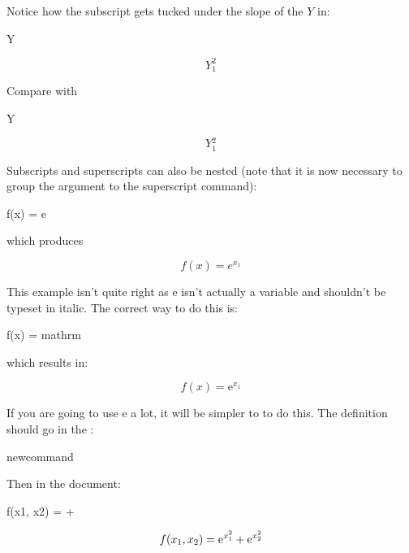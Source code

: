 Notice how the subscript gets tucked under the slope of the $Y$ in:
\begin{codeS}
Y
\end{codeS}
\begin{resultS}
\[ Y_{1}^{2} \]
\end{resultS}
Compare with
\begin{codeS}
Y\marg{}
\end{codeS}
\begin{resultS}
\[ Y{}_{1}^{2} \]

\end{resultS}


Subscripts and superscripts can also be nested (note that
it is now necessary to group the argument to the superscript command):
\begin{codeS}
 f(x) = e
\end{codeS}%
which produces
\begin{resultS}
\[
f(x) = e^{x_1}
\]
\end{resultS}

This example isn't quite right as e isn't actually a variable
and shouldn't be typeset in italic.  The correct way to do this
is:\bookpagebreak
\begin{codeS}
 f(x) =
\gls{mathrm}
\end{codeS}%
which results in:
\begin{resultS}
\[ f(x) = \mathrm{e}^{x_1} \]
\end{resultS}

\label{obj:e}If you are going to use e a lot,
it will be simpler to  to do
this. The definition should go in the
:
\begin{codeS}
\gls{newcommand}
\end{codeS}%
Then in the document:
\begin{codeS}
 f(x1, x2) 
 =  
  +
\end{codeS}%
\begin{resultS}
\[
f(x_1, x_2) = \mathrm{e}^{x_1^2} + \mathrm{e}^{x_2^2}
\]
\end{resultS}

